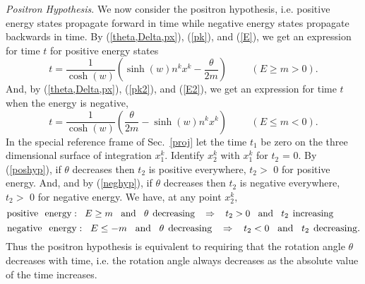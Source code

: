 \documentclass[a4paper,12pt]{article}
\begin{document}
	{\textit{Positron Hypothesis}}. We now consider the positron hypothesis, i.e. positive energy states propagate forward in time while negative energy states propagate backwards in time. By (\ref{theta,Delta,px}), (\ref{pk}), and (\ref{E}), we get an expression for time $t$ for positive energy states 
\begin{equation}	\label{poshyp}
t = \frac{1}{\cosh{(w)}} (\sinh{(w)}n^{k}x^{k} - \frac{\theta}{2m}) \hspace{1cm} (E \geq m > 0).
\end{equation}
And, by (\ref{theta,Delta,px}), (\ref{pk2}), and (\ref{E2}), we get an expression for time $t$ when the energy is negative, 
\begin{equation}	\label{neghyp}
t = \frac{1}{\cosh{(w)}} (\frac{\theta}{2m} - \sinh{(w)}n^{k}x^{k} ) \hspace{1cm} (E \leq m < 0).
\end{equation}
In the special reference frame of Sec.~\ref{proj} let the time $t_{1}$ be zero on the three dimensional surface of integration $x_{1}^{k}.$ Identify $x_{2}^{k}$ with $x_{1}^{k}$ for $t_{2}$ = 0. By (\ref{poshyp}), if $\theta$ decreases then $t_{2}$ is positive everywhere, $t_{2} >$ 0 for positive energy. And, and by (\ref{neghyp}), if $\theta$ decreases then $t_{2}$ is negative everywhere, $t_{2} >$ 0 for negative energy. We have, at any point $x_{2}^{k},$
$$
 {\mathrm{positive}}  \hspace{0.25 cm} {\mathrm{energy:}} \hspace{0.3 cm} E \geq m \hspace{0.3 cm} {\mathrm{and}} \hspace{0.3 cm} \theta \hspace{0.15 cm} {\mathrm{decreasing}} \hspace{0.3cm} \Rightarrow \hspace{0.3cm}  t_{2} > 0  \hspace{0.3 cm}	{\mathrm{and}} \hspace{0.3 cm} t_{2} \hspace{0.15 cm} {\mathrm{increasing}} \hspace{1. cm}
$$
\begin{equation}	\label{t+-a}
 {\mathrm{negative}}  \hspace{0.25 cm} {\mathrm{energy:}} \hspace{0.3 cm} E \leq -m \hspace{0.3 cm} {\mathrm{and}} \hspace{0.3 cm} \theta \hspace{0.15 cm} {\mathrm{decreasing}} \hspace{0.3cm} \Rightarrow \hspace{0.3cm}  t_{2} < 0  \hspace{0.3 cm}	{\mathrm{and}} \hspace{0.3 cm} t_{2} \hspace{0.15 cm} {\mathrm{decreasing}} .
\end{equation}
Thus the positron hypothesis is equivalent to requiring that the rotation angle $\theta$ decreases with time, i.e. the rotation angle always decreases as the absolute value of the time increases. 
\end{document}
